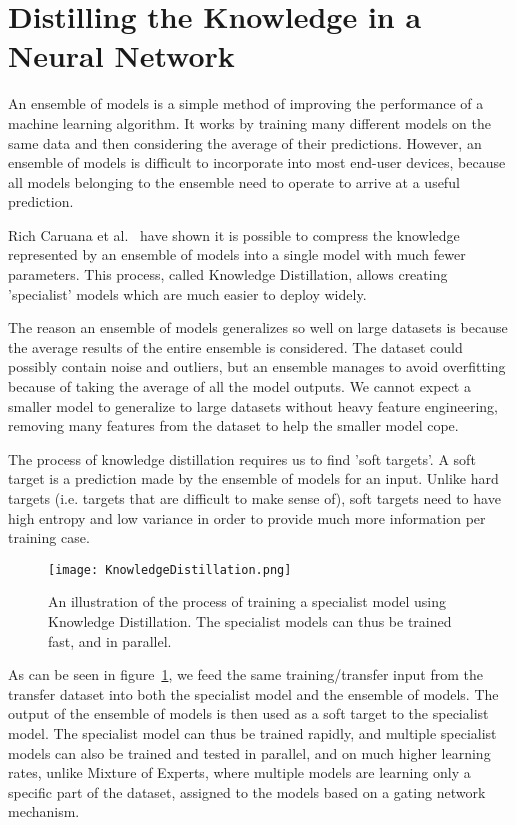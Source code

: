 \section{Distilling the Knowledge in a Neural Network}

An ensemble of models is a simple method of improving the performance of a machine learning algorithm.
It works by training many different models on the same data and then considering the average of their predictions.
However, an ensemble of models is difficult to incorporate into most end-user devices, because all models 
belonging to the ensemble need to operate to arrive at a useful prediction.

Rich Caruana et al.~\cite{caruana2015compression} have shown it is possible to compress the knowledge
represented by an ensemble of models into a single model with much fewer parameters. This process, called
Knowledge Distillation, allows creating 'specialist' models which are much easier to deploy widely.

The reason an ensemble of models generalizes so well on large datasets is because the average results of the entire 
ensemble is considered. The dataset could possibly contain noise and outliers, but an ensemble manages to avoid overfitting 
because of taking the average of all the model outputs. We cannot expect a smaller model to generalize to large 
datasets without heavy feature engineering, removing many features from the dataset to help the smaller model cope.

The process of knowledge distillation requires us to find 'soft targets'. A soft target is a prediction made by the 
ensemble of models for an input. Unlike hard targets (i.e. targets that are difficult to make sense of), 
soft targets need to have high entropy and low variance in order to provide much more information per training case.

\begin{figure}[h]
    \begin{center}
        \texttt{[image: KnowledgeDistillation.png]}
    \end{center}
    \caption{An illustration of the process of training a specialist model using Knowledge Distillation.
    The specialist models can thus be trained fast, and in parallel.}
    \label{fig:distillation}
\end{figure}

As can be seen in figure~\ref{fig:distillation}, we feed the same training/transfer input 
from the transfer dataset into both the specialist model and the ensemble of models. 
The output of the ensemble of models is then used as a soft target to the specialist model.
The specialist model can thus be trained rapidly, and multiple specialist models can also 
be trained and tested in parallel, and on much higher learning rates, unlike Mixture of Experts, 
where multiple models are learning only a specific part of the dataset, assigned to the models 
based on a gating network mechanism.

